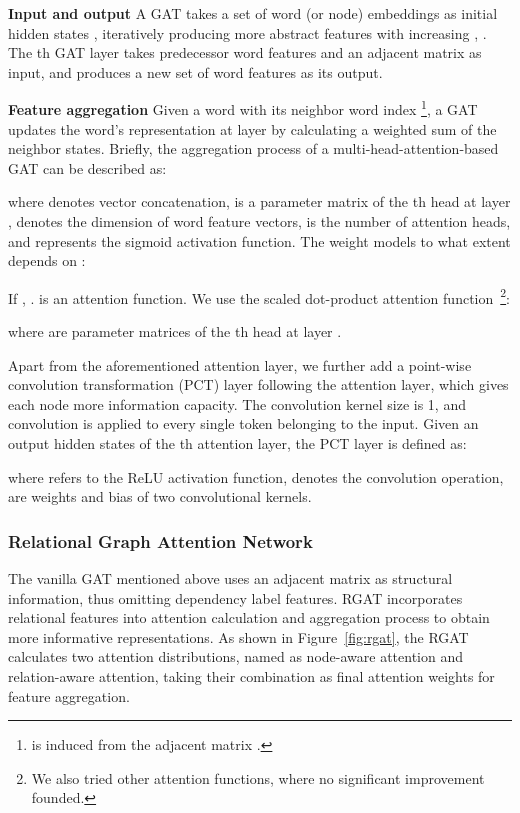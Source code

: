 \documentclass[journal]{IEEEtran}
\begin{document}
	\noindent\textbf{Input and output} 
	A GAT takes a set of word (or node) embeddings  as initial hidden states , iteratively producing more abstract features  with increasing , .
	The th GAT layer takes predecessor word features  and an adjacent matrix  as input,
	and produces a new set of word features  as its output.
	
	\noindent\textbf{Feature aggregation} 
	{Given a word  with its neighbor word index \footnote{{ is induced from the adjacent matrix .}}}, a GAT updates the word's representation at layer  by calculating a weighted sum of the neighbor states. 
	Briefly, the aggregation process of a multi-head-attention-based GAT can be described as:
	
	where  denotes vector concatenation,  is a parameter matrix of the th head at layer ,  denotes the dimension of word feature vectors,  is the number of attention heads,  and  represents the sigmoid activation function.
	The weight  models to what extent  depends on :
	

	{If , }.  is an attention function. We use the scaled dot-product attention function~\cite{Vaswani2017AttentionIA}\footnote{We also tried other attention functions, where no significant improvement founded.}:
	
	where  are parameter matrices of the th head at layer .
	
	Apart from the aforementioned attention layer, we further add a point-wise convolution transformation (PCT) layer following the attention layer, which gives each node more information capacity. 
	The convolution kernel size is 1, and convolution is applied to every single token belonging to the input. 
	Given an output hidden states  of the th attention layer, the PCT layer is defined as:
	
	where  refers to the ReLU activation function,  denotes the convolution operation,  are weights and bias of two convolutional kernels.
	\subsubsection{Relational Graph Attention Network}
	The vanilla GAT mentioned above uses an adjacent matrix as structural information, thus omitting dependency label features.
	RGAT incorporates relational features into attention calculation and aggregation process to obtain more informative representations. 
	As shown in Figure~\ref{fig:rgat}, the RGAT calculates two attention distributions, named as node-aware attention and relation-aware attention, taking their combination as final attention weights for feature aggregation. 
	
\end{document}
